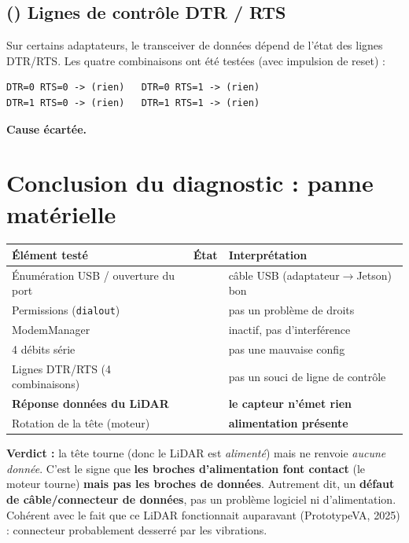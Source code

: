 \documentclass[a4paper,11pt]{article}
\newcommand{\ok}{\textcolor{success}{\checkmark}}
\newcommand{\ko}{\textcolor{danger}{\ding{55}}}
\begin{document}
\subsection{(\ko) Lignes de contrôle DTR / RTS}
Sur certains adaptateurs, le transceiver de données dépend de l'état des lignes
DTR/RTS. Les quatre combinaisons ont été testées (avec impulsion de reset) :
\begin{lstlisting}
DTR=0 RTS=0 -> (rien)   DTR=0 RTS=1 -> (rien)
DTR=1 RTS=0 -> (rien)   DTR=1 RTS=1 -> (rien)
\end{lstlisting}
\textbf{Cause écartée.}

\section{Conclusion du diagnostic : panne matérielle}
\begin{table}[H]
\centering
\begin{tabularx}{\textwidth}{@{}l c X@{}}
\toprule
Élément testé & État & Interprétation \\
\midrule
Énumération USB / ouverture du port & \ok & câble USB (adaptateur$\to$Jetson) bon \\
Permissions (\texttt{dialout})       & \ok & pas un problème de droits \\
ModemManager                         & \ok & inactif, pas d'interférence \\
4 débits série                       & \ok & pas une mauvaise config \\
Lignes DTR/RTS (4 combinaisons)      & \ok & pas un souci de ligne de contrôle \\
\textbf{Réponse données du LiDAR}    & \ko & \textbf{le capteur n'émet rien} \\
Rotation de la tête (moteur)         & \ok & \textbf{alimentation présente} \\
\bottomrule
\end{tabularx}
\end{table}

\noindent \textbf{Verdict :} la tête tourne (donc le LiDAR est \emph{alimenté})
mais ne renvoie \emph{aucune donnée}. C'est le signe que \textbf{les broches
d'alimentation font contact} (le moteur tourne) \textbf{mais pas les broches de
données}. Autrement dit, un \textbf{défaut de câble/connecteur de données}, pas
un problème logiciel ni d'alimentation. Cohérent avec le fait que ce LiDAR
fonctionnait auparavant (PrototypeVA, 2025) : connecteur probablement desserré
par les vibrations.
\end{document}
